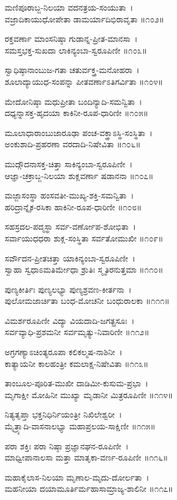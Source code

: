ಮಣಿಪೂರಾಬ್ಜ-ನಿಲಯಾ ವದನತ್ರಯ-ಸಂಯುತಾ~।\\
ವಜ್ರಾದಿಕಾಯುಧೋಪೇತಾ ಡಾಮರ್ಯಾದಿಭಿರಾವೃತಾ ॥೧೦೨॥

ರಕ್ತವರ್ಣಾ ಮಾಂಸನಿಷ್ಠಾ  ಗುಡಾನ್ನ-ಪ್ರೀತ-ಮಾನಸಾ~।\\
ಸಮಸ್ತಭಕ್ತ-ಸುಖದಾ ಲಾಕಿನ್ಯಂಬಾ-ಸ್ವರೂಪಿಣೀ ॥೧೦೩॥

ಸ್ವಾಧಿಷ್ಠಾನಾಂಬುಜ-ಗತಾ ಚತುರ್ವಕ್ತ್ರ-ಮನೋಹರಾ~।\\
ಶೂಲಾದ್ಯಾಯುಧ-ಸಂಪನ್ನಾ ಪೀತವರ್ಣಾಽತಿಗರ್ವಿತಾ ॥೧೦೪॥

ಮೇದೋನಿಷ್ಠಾ ಮಧುಪ್ರೀತಾ ಬಂದಿನ್ಯಾದಿ-ಸಮನ್ವಿತಾ~।\\
ದಧ್ಯನ್ನಾಸಕ್ತ-ಹೃದಯಾ ಕಾಕಿನೀ-ರೂಪ-ಧಾರಿಣೀ ॥೧೦೫॥

ಮೂಲಾಧಾರಾಂಬುಜಾರೂಢಾ ಪಂಚ-ವಕ್ತ್ರಾಽಸ್ಥಿ-ಸಂಸ್ಥಿತಾ~।\\
ಅಂಕುಶಾದಿ-ಪ್ರಹರಣಾ ವರದಾದಿ-ನಿಷೇವಿತಾ ॥೧೦೬॥

ಮುದ್ಗೌದನಾಸಕ್ತ-ಚಿತ್ತಾ ಸಾಕಿನ್ಯಂಬಾ-ಸ್ವರೂಪಿಣೀ~।\\
ಆಜ್ಞಾ-ಚಕ್ರಾಬ್ಜ-ನಿಲಯಾ ಶುಕ್ಲವರ್ಣಾ ಷಡಾನನಾ ॥೧೦೭॥

ಮಜ್ಜಾಸಂಸ್ಥಾ ಹಂಸವತೀ-ಮುಖ್ಯ-ಶಕ್ತಿ-ಸಮನ್ವಿತಾ~।\\
ಹರಿದ್ರಾನ್ನೈಕ-ರಸಿಕಾ ಹಾಕಿನೀ-ರೂಪ-ಧಾರಿಣೀ ॥೧೦೮॥

ಸಹಸ್ರದಲ-ಪದ್ಮಸ್ಥಾ ಸರ್ವ-ವರ್ಣೋಪ-ಶೋಭಿತಾ~।\\
ಸರ್ವಾಯುಧಧರಾ ಶುಕ್ಲ-ಸಂಸ್ಥಿತಾ ಸರ್ವತೋಮುಖೀ ॥೧೦೯॥

ಸರ್ವೌದನ-ಪ್ರೀತಚಿತ್ತಾ ಯಾಕಿನ್ಯಂಬಾ-ಸ್ವರೂಪಿಣೀ~।\\
ಸ್ವಾಹಾ ಸ್ವಧಾಽಮತಿರ್ಮೇಧಾ ಶ್ರುತಿಃ ಸ್ಮೃತಿರನುತ್ತಮಾ ॥೧೧೦॥

ಪುಣ್ಯಕೀರ್ತಿಃ ಪುಣ್ಯಲಭ್ಯಾ ಪುಣ್ಯಶ್ರವಣ-ಕೀರ್ತನಾ~।\\
ಪುಲೋಮಜಾರ್ಚಿತಾ ಬಂಧ-ಮೋಚನೀ ಬಂಧುರಾಲಕಾ ॥೧೧೧॥

ವಿಮರ್ಶರೂಪಿಣೀ ವಿದ್ಯಾ ವಿಯದಾದಿ-ಜಗತ್ಪ್ರಸೂಃ~।\\
ಸರ್ವವ್ಯಾಧಿ-ಪ್ರಶಮನೀ ಸರ್ವಮೃತ್ಯು-ನಿವಾರಿಣೀ ॥೧೧೨॥

ಅಗ್ರಗಣ್ಯಾಽಚಿಂತ್ಯರೂಪಾ ಕಲಿಕಲ್ಮಷ-ನಾಶಿನೀ~।\\
ಕಾತ್ಯಾಯನೀ ಕಾಲಹಂತ್ರೀ ಕಮಲಾಕ್ಷ-ನಿಷೇವಿತಾ ॥೧೧೩॥

ತಾಂಬೂಲ-ಪೂರಿತ-ಮುಖೀ ದಾಡಿಮೀ-ಕುಸುಮ-ಪ್ರಭಾ~।\\
ಮೃಗಾಕ್ಷೀ ಮೋಹಿನೀ ಮುಖ್ಯಾ ಮೃಡಾನೀ ಮಿತ್ರರೂಪಿಣೀ ॥೧೧೪॥

ನಿತ್ಯತೃಪ್ತಾ ಭಕ್ತನಿಧಿರ್ನಿಯಂತ್ರೀ ನಿಖಿಲೇಶ್ವರೀ~।\\
ಮೈತ್ರ್ಯಾದಿ-ವಾಸನಾಲಭ್ಯಾ ಮಹಾಪ್ರಲಯ-ಸಾಕ್ಷಿಣೀ ॥೧೧೫॥

ಪರಾ ಶಕ್ತಿಃ ಪರಾ ನಿಷ್ಠಾ ಪ್ರಜ್ಞಾನಘನ-ರೂಪಿಣೀ~।\\
ಮಾಧ್ವೀಪಾನಾಲಸಾ ಮತ್ತಾ ಮಾತೃಕಾ-ವರ್ಣ-ರೂಪಿಣೀ ॥೧೧೬॥

ಮಹಾಕೈಲಾಸ-ನಿಲಯಾ ಮೃಣಾಲ-ಮೃದು-ದೋರ್ಲತಾ~।\\
ಮಹನೀಯಾ ದಯಾಮೂರ್ತಿರ್ಮಹಾಸಾಮ್ರಾಜ್ಯ-ಶಾಲಿನೀ ॥೧೧೭॥

